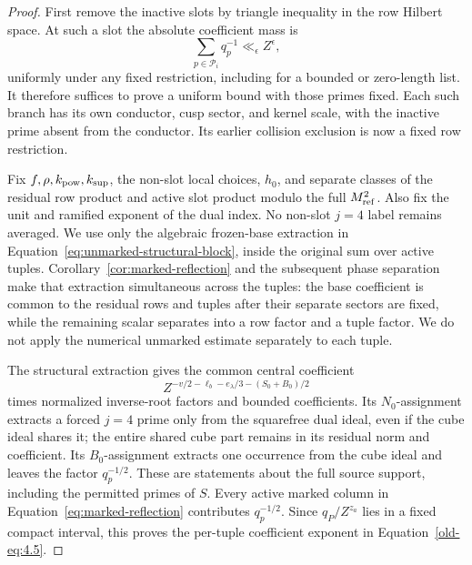 \documentclass[11pt,a4paper]{article}
\numberwithin{equation}{section}
\numberwithin{figure}{section}
\theoremstyle{definition}
\theoremstyle{remark}
\begin{document}
\begin{proof}
First remove the inactive slots by triangle inequality in the row Hilbert
space.  At such a slot the absolute coefficient mass is
\[
 \sum_{p\in\mathcal P_i}q_p^{-1}\ll_\epsilon Z^\epsilon,
\]
uniformly under any fixed restriction, including for a bounded or zero-length
list.  It therefore suffices to prove a uniform bound with those primes fixed.
Each such branch has its own conductor, cusp sector, and kernel scale, with
the inactive prime absent from the conductor.  Its earlier collision exclusion
is now a fixed row restriction.

Fix \(f,\rho,k_{\rm pow},k_{\rm sup}\), the non-slot local choices, \(h_0\),
and separate classes of the residual row product and active slot product
modulo the full \(M_{\rm ref}^2\).  Also fix the unit and ramified exponent of
the dual index.  No non-slot \(j=4\) label remains averaged.  We use only the
algebraic frozen-base extraction in
Equation~\eqref{eq:unmarked-structural-block}, inside the original sum over
active tuples.  Corollary~\ref{cor:marked-reflection} and the subsequent phase
separation make that extraction simultaneous across the tuples: the base
coefficient is common to the residual rows and tuples after their separate
sectors are fixed, while the remaining scalar separates into a row factor and
a tuple factor.  We do not apply the numerical unmarked estimate separately
to each tuple.

The structural extraction gives the common central coefficient
\[
 Z^{-v/2-\ell_b-e_\lambda/3-(S_0+B_0)/2}
\]
times normalized inverse-root factors and bounded coefficients.  Its
\(N_0\)-assignment extracts a forced \(j=4\) prime only from the squarefree
dual ideal, even if the cube ideal shares it; the entire shared cube part
remains in its residual norm and coefficient.  Its \(B_0\)-assignment extracts
one occurrence from the cube ideal and leaves the factor \(q_p^{-1/2}\).
These are statements about the full source support, including the permitted
primes of \(S\).  Every active marked column in
Equation~\eqref{eq:marked-reflection} contributes \(q_p^{-1/2}\).
Since \(q_P/Z^{z_a}\) lies in a fixed compact interval, this proves the
per-tuple coefficient exponent in Equation~\eqref{old-eq:4.5}.


\end{proof}
\end{document}
